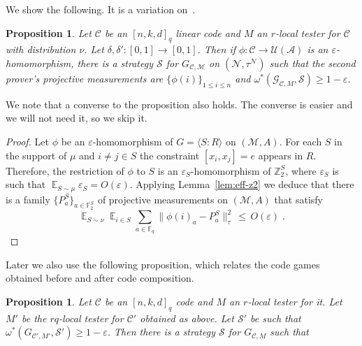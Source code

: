 \documentclass[11pt]{article}
\newtheorem{proposition}[theorem]{Proposition}
\theoremstyle{definition}
\newcommand{\code}{\mathcal{C}}
\newcommand{\strategy}{\mathscr{S}}
\DeclareMathOperator*{\Expectation}{\mathbb{E}}
\newcommand{\Es}[1]{\Expectation_{#1}}
\newcommand{\F}{\ensuremath{\mathbb{F}}}
\newcommand{\Z}{\ensuremath{\mathbb{Z}}}
\newcommand{\mA}{\ensuremath{\mathcal{A}}}
\newcommand{\mG}{\ensuremath{\mathcal{G}}}
\newcommand{\mM}{\ensuremath{\mathcal{M}}}
\newcommand{\mU}{\ensuremath{\mathcal{U}}}
\newcommand{\eps}{\varepsilon}
\newcommand{\mN}{\mathcal{N}}
\newcommand{\G}{\mG}
\begin{document}
We show the following. It is a variation on~\cite[Proposition 3.4]{slofstra2019set}.

\begin{proposition}\label{prop:sound-game}
Let $\code$ be an $[n,k,d]_q$ linear code and $M$ an $r$-local tester for $\code$ with distribution $\nu$. Let $\delta,\delta':[0,1]\to[0,1]$. Then if $\phi:\code\to \mU(\mA)$ is an $\eps$-homomorphism, there is a strategy $\strategy$ for $G_{\code,\mM}$ on $(\mN,\tau^\mN)$ such that the second prover's projective measurements are $\{\phi(i)\}_{1\leq i \leq n}$ and $\omega^*(\G_{\code,M},\strategy)\geq 1-\eps$. 
\end{proposition}

We note that a converse to the proposition also holds. The converse is easier and we will not need it, so we skip it. 

\begin{proof}
Let $\phi$ be an $\eps$-homomorphism of $G=\langle S:R\rangle$ on $(\mM,A)$. For each $S$ in the support of $\mu$ and $i\neq j \in S$ the constraint $[x_i,x_j]=e$ appears in $R$. Therefore, the restriction of $\phi$ to $S$ is an $\eps_S$-homomorphism of $\Z_2^S$, where $\eps_S$ is such that $\Es{S\sim \mu} \eps_S = O(\eps)$. Applying Lemma~\ref{lem:eff-z2} we deduce that there is a family $\{P^S_a\}_{a\in \F_2^S}$ of projective measurements on $(\mM,A)$ that satisfy 
\[ \Es{S \sim \nu} \Es{i\in S} \sum_{a \in \F_q} \big\| \phi(i)_a - P^S_a \big\|_\tau^2  \,\leq\,O(\eps)\;.\]
\end{proof}

Later we also use the following proposition, which relates the code games obtained before and after code composition. 


\begin{proposition}\label{prop:q-to-2}
Let $\code$ be an $[n,k,d]_q$ code and $M$ an $r$-local tester for it. Let $M'$ be the $rq$-local tester for $\code'$ obtained as above. Let $\strategy'$ be such that $\omega^*(G_{\code',M'},\strategy')\geq 1-\eps$. Then there is a strategy $\strategy$ for $G_{\code,M}$ such that  
\end{proposition}
\end{document}
